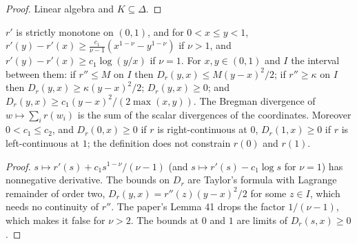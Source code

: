 \begin{proof}
  \leanok
  Linear algebra and $K \subseteq \Delta$.
\end{proof}

\begin{lemma}
  \label{lem:barrier_scalar}
  \leanok
  $r'$ is strictly monotone on $(0, 1)$, and for $0 < x \le y < 1$,
  $r'(y) - r'(x) \ge \frac{c_1}{\nu - 1}(x^{1-\nu} - y^{1-\nu})$ if $\nu > 1$, and
  $r'(y) - r'(x) \ge c_1\log(y/x)$ if $\nu = 1$. For $x, y \in (0, 1)$ and $I$ the interval between
  them: if $r'' \le M$ on $I$ then $D_r(y, x) \le M(y - x)^2/2$; if $r'' \ge \kappa$ on $I$ then
  $D_r(y, x) \ge \kappa(y - x)^2/2$; $D_r(y, x) \ge 0$; and
  $D_r(y, x) \ge c_1(y - x)^2/(2\max(x, y))$. The Bregman divergence of $w \mapsto \sum_i r(w_i)$
  is the sum of the scalar divergences of the coordinates. Moreover $0 < c_1 \le c_2$, and
  $D_r(0, x) \ge 0$ if $r$ is right-continuous at $0$, $D_r(1, x) \ge 0$ if $r$ is left-continuous
  at $1$; the definition does not constrain $r(0)$ and $r(1)$.
\end{lemma}

\begin{proof}
  \leanok
  $s \mapsto r'(s) + c_1 s^{1-\nu}/(\nu - 1)$ (and $s \mapsto r'(s) - c_1\log s$ for $\nu = 1$) has
  nonnegative derivative. The bounds on $D_r$ are Taylor's formula with Lagrange remainder of order
  two, $D_r(y, x) = r''(z)(y - x)^2/2$ for some $z \in I$, which needs no continuity of $r''$. The
  paper's Lemma 41 drops the factor $1/(\nu - 1)$, which makes it false for $\nu > 2$. The bounds
  at $0$ and $1$ are limits of $D_r(s, x) \ge 0$.
\end{proof}

